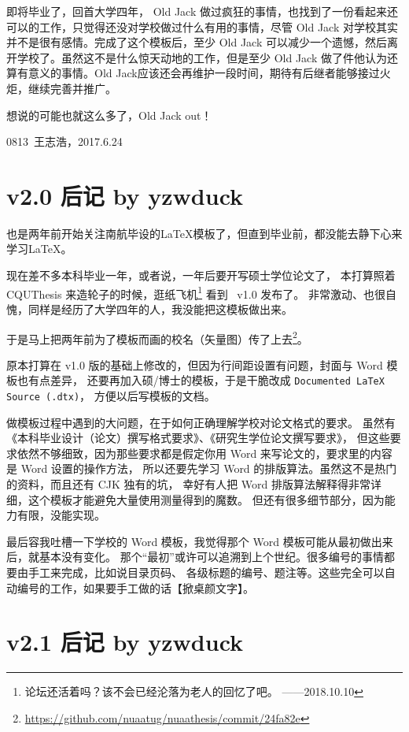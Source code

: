 即将毕业了，回首大学四年， Old Jack 做过疯狂的事情，也找到了一份看起来还可以的工作，只觉得还没对学校做过什么有用的事情，尽管 Old Jack 对学校其实并不是很有感情。完成了这个模板后，至少 Old Jack 可以减少一个遗憾，然后离开学校了。虽然这不是什么惊天动地的工作，但是至少 Old Jack 做了件他认为还算有意义的事情。Old Jack应该还会再维护\nuaathesis 一段时间，期待有后继者能够接过火炬，继续完善并推广\nuaathesis 。

想说的可能也就这么多了，Old Jack out！

\hfill 0813~王志浩，2017.6.24

\section{v2.0 后记 by yzwduck}

也是两年前开始关注南航毕设的\LaTeX 模板了，但直到毕业前，都没能去静下心来学习\LaTeX。

现在差不多本科毕业一年，或者说，一年后要开写硕士学位论文了，
本打算照着 CQUThesis 来造轮子的时候，逛纸飞机\footnote{论坛还活着吗？该不会已经沦落为老人的回忆了吧。 ——2018.10.10}
看到 \nuaathesis~v1.0 发布了。
非常激动、也很自愧，同样是经历了大学四年的人，我没能把这模板做出来。

于是马上把两年前为了模板而画的校名（矢量图）传了上去\footnote{\url{https://github.com/nuaatug/nuaathesis/commit/24fa82e}}。

原本打算在 v1.0 版的基础上修改的，但因为行间距设置有问题，封面与 Word 模板也有点差异，
还要再加入硕/博士的模板，于是干脆改成 \texttt{Documented LaTeX Source (.dtx)}，
方便以后写模板的文档。

做模板过程中遇到的大问题，在于如何正确理解学校对论文格式的要求。
虽然有《本科毕业设计（论文）撰写格式要求》、《研究生学位论文撰写要求》，
但这些要求依然不够细致，因为那些要求都是假定你用 Word 来写论文的，要求里的内容是 Word 设置的操作方法，
所以还要先学习 Word 的排版算法。虽然这不是热门的资料，而且还有 CJK 独有的坑，
幸好有人把 Word 排版算法解释得非常详细，这个模板才能避免大量使用测量得到的魔数。
但还有很多细节部分，因为能力有限，没能实现。

最后容我吐槽一下学校的 Word 模板，我觉得那个 Word 模板可能从最初做出来后，就基本没有变化。
那个“最初”或许可以追溯到上个世纪。很多编号的事情都要由手工来完成，比如说目录页码、
各级标题的编号、题注等。这些完全可以自动编号的工作，如果要手工做的话【掀桌颜文字】。

\section{v2.1 后记 by yzwduck}

